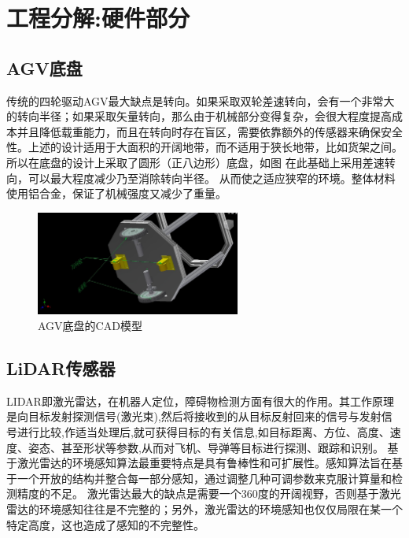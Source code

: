 \documentclass[cs4size,a4paper]{ctexart}
\numberwithin{equation}{section}
\numberwithin{table}{section}
\numberwithin{figure}{section}
\begin{document}
\section{工程分解:硬件部分}

\subsection{AGV底盘}
传统的四轮驱动AGV最大缺点是转向。如果采取双轮差速转向，会有一个非常大的转向半径；如果采取矢量转向，那么由于机械部分变得复杂，会很大程度提高成本并且降低载重能力，而且在转向时存在盲区，需要依靠额外的传感器来确保安全性。上述的设计适用于大面积的开阔地带，而不适用于狭长地带，比如货架之间。所以在底盘的设计上采取了圆形（正八边形）底盘，如图 在此基础上采用差速转向，可以最大程度减少乃至消除转向半径。
从而使之适应狭窄的环境。整体材料使用铝合金，保证了机械强度又减少了重量。
\begin{figure}[H]
        \centering
        \includegraphics[width=0.6\textwidth]{figure/wheel.png}
        \caption{AGV底盘的CAD模型}
\end{figure}

\subsection{LiDAR传感器}
LIDAR即激光雷达，在机器人定位，障碍物检测方面有很大的作用。其工作原理是向目标发射探测信号(激光束),然后将接收到的从目标反射回来的信号与发射信号进行比较,作适当处理后,就可获得目标的有关信息,如目标距离、方位、高度、速度、姿态、甚至形状等参数,从而对飞机、导弹等目标进行探测、跟踪和识别。
基于激光雷达的环境感知算法最重要特点是具有鲁棒性和可扩展性。感知算法旨在基于一个开放的结构并整合每一部分感知，通过调整几种可调参数来克服计算量和检测精度的不足。
激光雷达最大的缺点是需要一个360度的开阔视野，否则基于激光雷达的环境感知往往是不完整的；另外，激光雷达的环境感知也仅仅局限在某一个特定高度，这也造成了感知的不完整性。
\end{document}
